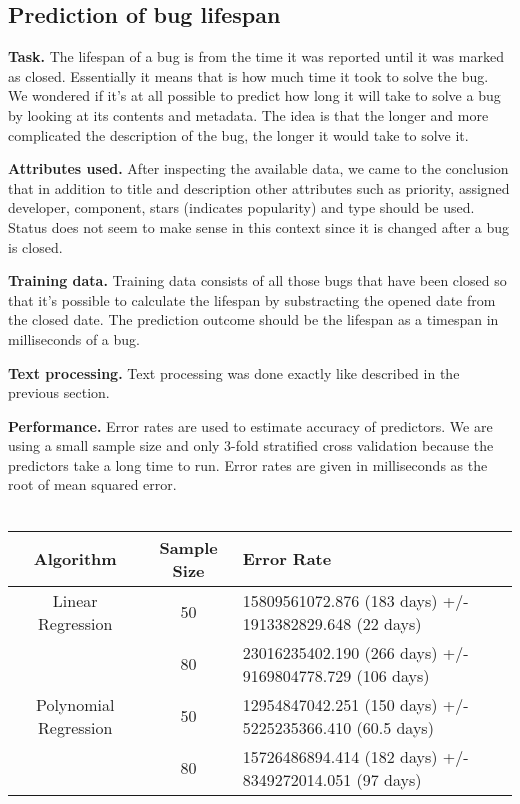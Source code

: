 \subsection{Prediction of bug lifespan} %
\label{sub:Prediction of bug lifespan}

{\bf Task.} The lifespan of a bug is from the time it was reported until it was marked as closed. Essentially it means that is how much time it took to solve the bug. We wondered if it's at all possible to predict how long it will take to solve a bug by looking at its contents and metadata. The idea is that the longer and more complicated the description of the bug, the longer it would take to solve it.

{\bf Attributes used.} After inspecting the available data, we came to the conclusion that in addition to title and description other attributes such as priority, assigned developer, component, stars (indicates popularity) and type should be used. Status does not seem to make sense in this context since it is changed after a bug is closed.

{\bf Training data.} Training data consists of all those bugs that have been closed so that it's possible to calculate the lifespan by substracting the opened date from the closed date. The prediction outcome should be the lifespan as a timespan in milliseconds of a bug.

{\bf Text processing.} Text processing was done exactly like described in the previous section.

{\bf Performance.} Error rates are used to estimate accuracy of predictors. We are using a small sample size and only 3-fold stratified cross validation because the predictors take a long time to run. Error rates are given in milliseconds as the root of mean squared error.
\\
\\
\begin{tabular}{|c|c|p{8cm}|}
\hline
 Algorithm    & Sample Size &  Error Rate   \\
\hline
\hline
Linear Regression     &  50 & 15809561072.876 (183 days) +/- 1913382829.648 (22 days) \\
                      &  80 &  23016235402.190 (266 days) +/- 9169804778.729 (106 days) \\
Polynomial Regression &  50 &  12954847042.251 (150 days) +/- 5225235366.410 (60.5 days) \\
                      &  80 &  15726486894.414 (182 days) +/- 8349272014.051 (97 days) \\
\hline
\end{tabular}
\\
\\

